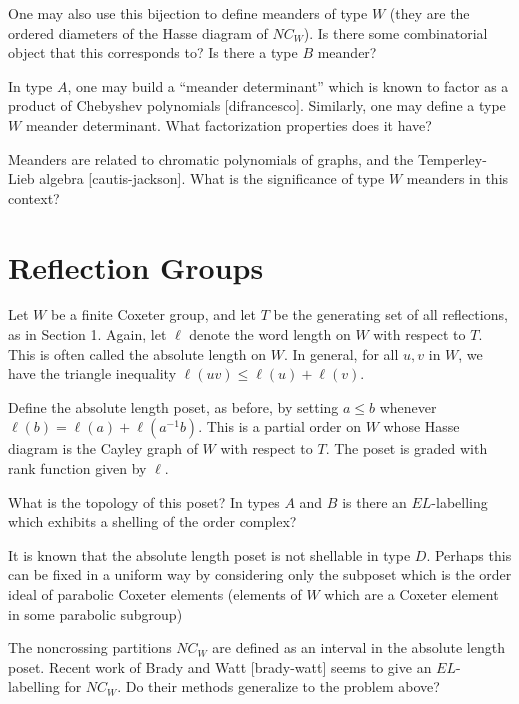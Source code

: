 \documentclass[12pt,letterpaper, reqno]{amsart}
\begin{document}
\begin{problemblock}
\begin{problem}[2.6]
One may also use this bijection to define meanders of type $W$ (they are the ordered diameters of the Hasse diagram of $NC_W$). Is there some combinatorial object that this corresponds to? Is there a type $B$ meander?
\end{problem}

\begin{remark}
 In type $A$, one may build a ``meander determinant'' which is known to factor as a product of Chebyshev polynomials [difrancesco]. Similarly, one may define a type $W$ meander determinant. What factorization properties does it have?

Meanders are related to chromatic polynomials of graphs, and the Temperley-Lieb algebra [cautis-jackson]. What is the significance of type $W$ meanders in this context?
\end{remark}

\end{problemblock}

\section{Reflection Groups}

\begin{problemblock}
Let $W$ be a finite Coxeter group, and let $T$ be the generating set of all reflections, as in Section 1. Again, let $\ell$ denote the word length on $W$ with respect to $T$. This is often called the 
absolute length on $W$. In general, for all $u,v$ in $W$, we have the triangle inequality $\ell(uv)\leq \ell(u)+\ell(v)$.

Define the absolute length poset, as before, by setting $a\leq b$ whenever $\ell(b)=\ell(a)+\ell(a^{-1}b)$. This is a partial order on $W$ whose Hasse diagram is the Cayley graph of $W$ with respect to $T$. The poset is graded with rank function given by $\ell$.


\begin{problem}[3.1] 
What is the topology of this poset? In types $A$ and $B$ is there an $EL$-labelling which exhibits a shelling of the order complex?
\end{problem}

\begin{distinguishedremark}
 It is known that the absolute length poset is not shellable in type $D$. Perhaps this can be fixed in a uniform way by considering only the subposet which is the order ideal of parabolic Coxeter elements (elements of $W$ which are a Coxeter element in some parabolic subgroup)
\end{distinguishedremark}

\begin{remark}
The noncrossing partitions $NC_W$ are defined as an interval in the absolute length poset. Recent work of Brady and Watt [brady-watt] seems to give an $EL$-labelling for $NC_W$. Do their methods generalize to the problem above?
\end{remark}

\end{problemblock}
\end{document}
